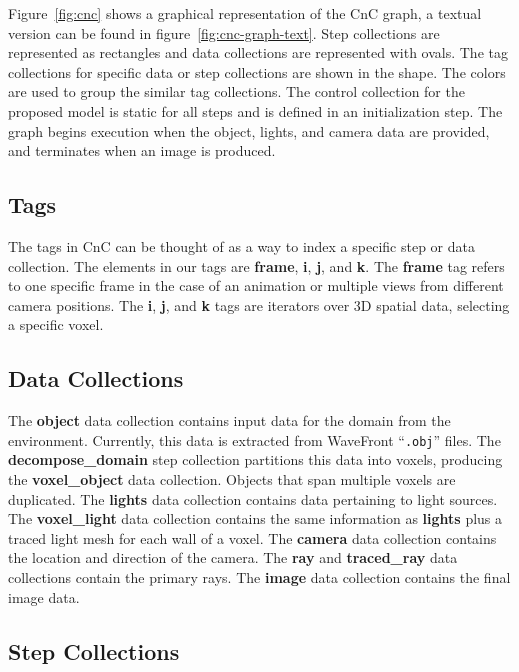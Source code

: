 Figure~\ref{fig:cnc} shows a graphical representation of the CnC graph, a 
textual version can be found in figure~\ref{fig:cnc-graph-text}.  Step 
collections  are represented as rectangles and data collections are represented
with ovals.  The tag collections for specific data or step collections are shown
in the shape.  The colors are used to group the similar tag collections. The 
control collection for the proposed model is static for all steps and is defined 
in an initialization step. The graph begins execution when the object, lights, 
and camera data are provided, and terminates when an image is produced.

\subsection{Tags}
The tags in CnC can be thought of as a way to index a specific step or data 
collection.  The elements in our tags are \textbf{frame}, \textbf{i}, 
\textbf{j}, and \textbf{k}.  The \textbf{frame} tag refers to one specific frame 
in the case of an animation or multiple views from different camera positions. 
The \textbf{i}, \textbf{j}, and \textbf{k} tags are iterators over 3D spatial 
data, selecting a specific voxel. 

\subsection{Data Collections}
\label{sec:datacollections}

The \textbf{object} data collection contains input data for the domain from the
environment. Currently, this data is extracted from WaveFront
``\texttt{.obj}'' files. The \textbf{decompose\_domain} step collection
partitions this data into voxels, producing the \textbf{voxel\_object} data
collection. Objects that span multiple voxels are duplicated. The
\textbf{lights} data collection contains data pertaining to light sources. The
\textbf{voxel\_light} data collection contains the same information as 
\textbf{lights} plus a traced light mesh for each wall of a voxel. The 
\textbf{camera} data collection contains the location and direction of the 
camera. The \textbf{ray} and \textbf{traced\_ray} data collections contain the 
primary rays. The \textbf{image} data collection contains the final image data.

\subsection{Step Collections}

